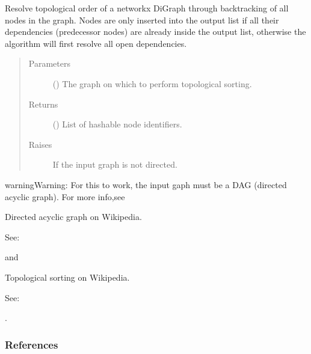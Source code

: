 \documentclass[letterpaper,10pt,english]{sphinxmanual}
\begin{document}
\begin{fulllineitems}
\label{\detokenize{cockatoo:cockatoo.utilities.resolve_order_by_backtracking}}
Resolve topological order of a networkx DiGraph through backtracking of
all nodes in the graph. Nodes are only inserted into the output list if
all their dependencies (predecessor nodes) are already inside the output
list, otherwise the algorithm will first resolve all open dependencies.
\begin{quote}\begin{description}
\item[{Parameters}] \leavevmode
{} () \textendash{} The graph on which to perform topological sorting.

\item[{Returns}] \leavevmode
{} () \textendash{} List of hashable node identifiers.

\item[{Raises}] \leavevmode
{} \textendash{} If the input graph is not directed.

\end{description}\end{quote}

\begin{sphinxadmonition}{warning}{Warning:}
For this to work, the input gaph must be a DAG (directed acyclic graph).
For more info,see %
\begin{footnote}[11]\sphinxAtStartFootnote
Directed acyclic graph on Wikipedia.

See: 
%
\end{footnote} and %
\begin{footnote}[12]\sphinxAtStartFootnote
Topological sorting on Wikipedia.

See: 
%
\end{footnote}.
\end{sphinxadmonition}
\subsubsection*{References}

\end{fulllineitems}
\end{document}
